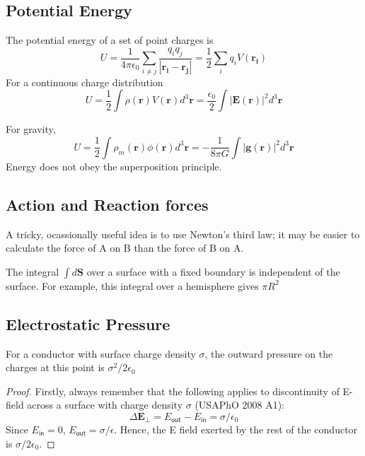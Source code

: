 \subsection{Potential Energy}
The potential energy of a set of point charges is 
\begin{equation}
    U=\frac{1}{4\pi\epsilon_0} \sum_{i\neq j} \frac{q_i q_j}{|\mathbf{r_i}-\mathbf{r_j}|}=\frac{1}{2}\sum_i q_i V(\mathbf{r_i})
\end{equation}
For a continuous charge distribution
\begin{equation}
    U=\frac{1}{2}\int \rho(\mathbf{r})V(\mathbf{r})d^3 \mathbf{r}=\frac{\epsilon_0}{2}\int |\mathbf{E(r)}|^2 d^3 \mathbf{r}
\end{equation}

For gravity, 
\begin{equation}
    U=\frac{1}{2}\int \rho_m(\mathbf{r})\phi(\mathbf{r})d^3 \mathbf{r}=-\frac{1}{8\pi G}\int |\mathbf{g(r)}|^2 d^3 \mathbf{r}
\end{equation}
Energy does not obey the superposition principle.

\subsection{Action and Reaction forces}
A tricky, ocassionally useful idea is to use Newton's third law; it may be easier to calculate the force of A on B than the force of B on A. 

The integral $\int d\mathbf{S}$ over a surface with a fixed boundary is independent of the surface. For example, this integral over a hemisphere gives $\pi R^2$

\subsection{Electrostatic Pressure}
For a conductor with surface charge density $\sigma$, the outward pressure on the charges at this point is $\sigma^2/2\epsilon_0$

\begin{proof}
    Firstly, always remember that the following applies to discontinuity of E-field across a surface with charge density $\sigma$ (USAPhO 2008 A1):
    \begin{equation}
        \Delta \mathbf{E}_\perp=E_{\textsf{out}}-E_{\textsf{in}}=\sigma/\epsilon_0
    \end{equation}
    Since $E_\textsf{in}=0$, $E_{\textsf{out}}=\sigma/\epsilon$. Hence, the E field exerted by the rest of the conductor is $\sigma/2\epsilon_0$.
\end{proof}

